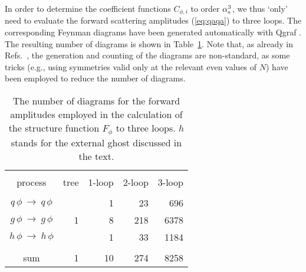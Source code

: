 \documentclass[12pt]{article}
\newcommand{\as}{\alpha_{\rm s}}
\newcommand{\ra}{\rightarrow}
\begin{document}
In order to determine the coefficient functions $C_{\phi,i}$ to order $\as^3$,
we thus `only' need to evaluate the forward scattering amplitudes
(\ref{eq:qaqa}) to three loops. The corresponding Feynman diagrams have been 
generated automatically with {\sc Qgraf} \cite{Nogueira:1991ex}. The resulting
number of diagrams is shown in Table~\ref{tab:diagrams}. Note that, as already
in Refs.~\cite{Mom3loop}, the generation and counting of the diagrams are 
non-standard, as some tricks (e.g., using symmetries valid only at the relevant
even values of $N$) have been employed to reduce the number of diagrams. 
%
\begin{table}[htp]
%
\vspace{-3mm}
\begin{center}
\begin{tabular}{c r r r r}\\
\hline & & & & \\[-3mm]
{process} &{tree} &1-loop &2-loop &3-loop \\[1mm]
\hline & & & & \\[-3mm]
$q\,\phi\:\ra\: q\,\phi$ &   &  1 &  23 &   696 \\
$g\,\phi\:\ra\: g\,\phi$ & 1 &  8 & 218 &  6378 \\
$h\,\phi\:\ra\: h\,\phi$ &   &  1 &  33 &  1184 \\[1mm]
\hline & & & & \\[-2mm]
 sum & 1 & 10 & 274 & 8258 \\[1mm] \hline
\end{tabular}
\end{center}
\vspace{-3mm}
\caption{ \label{tab:diagrams}
 The number of diagrams for the forward amplitudes employed in the calculation 
 of the structure function $F_\phi$ to three loops. $h$ stands for the external
 ghost discussed in the text.}
\vspace{-3mm}
\end{table}
 
\end{document}
